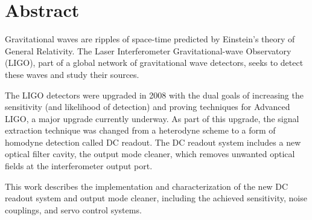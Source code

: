 \chapter*{Abstract}
Gravitational waves are ripples of space-time predicted by Einstein's
theory of General Relativity.  The Laser Interferometer
Gravitational-wave Observatory (LIGO), part of a global network of
gravitational wave detectors, seeks to detect these waves and study
their sources.

The LIGO detectors were upgraded in 2008 with the dual goals of
increasing the sensitivity (and likelihood of detection) and proving
techniques for Advanced LIGO, a major upgrade currently underway.  As
part of this upgrade, the signal extraction technique was changed from
a heterodyne scheme to a form of homodyne detection called DC readout.
The DC readout system includes a new optical filter cavity, the output
mode cleaner, which removes unwanted optical fields at the
interferometer output port.

This work describes the implementation and characterization of the new
DC readout system and output mode cleaner, including the achieved
sensitivity, noise couplings, and servo control systems.

